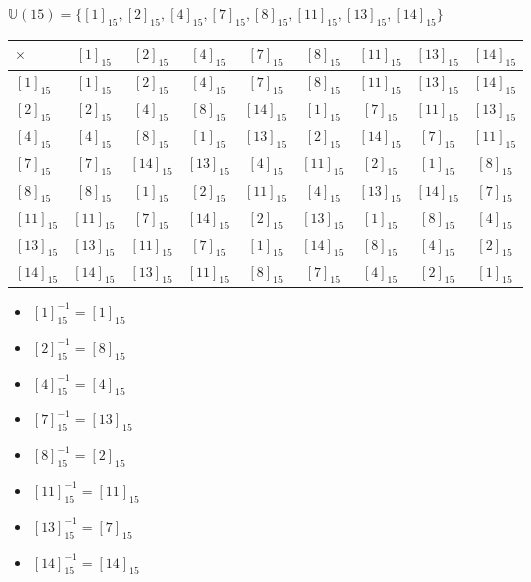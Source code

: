 \documentclass{article}
\begin{document}
\begin{enumerate}
    \vspace{0.1mm}
    $\mathbb{U}(15)=\{[1]_{15},[2]_{15},[4]_{15},[7]_{15},[8]_{15},[11]_{15},[13]_{15},[14]_{15}\}$
    \begin{center}
    \begin{tabular}{|l|| c c c c c c c c|} 
        \hline
        \rowcolor{cyan}
         \color{purple}$\times$ & $[1]_{15}$ & $[2]_{15}$ & $[4]_{15}$ & $[7]_{15}$ & $[8]_{15}$ & $[11]_{15}$ & $[13]_{15}$ & $[14]_{15}$\\
         \hline\hline
         $[1]_{15}$ & $[1]_{15}$ & $[2]_{15}$ & $[4]_{15}$ & $[7]_{15}$ & $[8]_{15}$ & $[11]_{15}$ & $[13]_{15}$ & $[14]_{15}$\\
         $[2]_{15}$ & $[2]_{15}$ & $[4]_{15}$ & $[8]_{15}$ & $[14]_{15}$ & $[1]_{15}$ & $[7]_{15}$ & $[11]_{15}$ & $[13]_{15}$\\
         $[4]_{15}$ & $[4]_{15}$ & $[8]_{15}$ & $[1]_{15}$ & $[13]_{15}$ & $[2]_{15}$ & $[14]_{15}$ & $[7]_{15}$ & $[11]_{15}$\\
         $[7]_{15}$ & $[7]_{15}$ & $[14]_{15}$ & $[13]_{15}$ & $[4]_{15}$ & $[11]_{15}$ & $[2]_{15}$ & $[1]_{15}$ & $[8]_{15}$\\
         $[8]_{15}$ & $[8]_{15}$ & $[1]_{15}$ & $[2]_{15}$ & $[11]_{15}$ & $[4]_{15}$ & $[13]_{15}$ & $[14]_{15}$ & $[7]_{15}$\\
         $[11]_{15}$ & $[11]_{15}$ & $[7]_{15}$ & $[14]_{15}$ & $[2]_{15}$ & $[13]_{15}$ & $[1]_{15}$ & $[8]_{15}$ & $[4]_{15}$\\
         $[13]_{15}$ & $[13]_{15}$ & $[11]_{15}$ & $[7]_{15}$ & $[1]_{15}$ & $[14]_{15}$ & $[8]_{15}$ & $[4]_{15}$ & $[2]_{15}$\\
         $[14]_{15}$ & $[14]_{15}$ & $[13]_{15}$ & $[11]_{15}$ & $[8]_{15}$ & $[7]_{15}$ & $[4]_{15}$ & $[2]_{15}$ & $[1]_{15}$\\
         \hline
    \end{tabular}
    \end{center}
    \begin{itemize}
        \item $[1]_{15}^{-1}=[1]_{15}$
        \item $[2]_{15}^{-1}=[8]_{15}$
        \item $[4]_{15}^{-1}=[4]_{15}$
        \item $[7]_{15}^{-1}=[13]_{15}$
        \item $[8]_{15}^{-1}=[2]_{15}$
        \item $[11]_{15}^{-1}=[11]_{15}$
        \item $[13]_{15}^{-1}=[7]_{15}$
        \item $[14]_{15}^{-1}=[14]_{15}$
    \end{itemize}
    

\end{enumerate}
\end{document}
